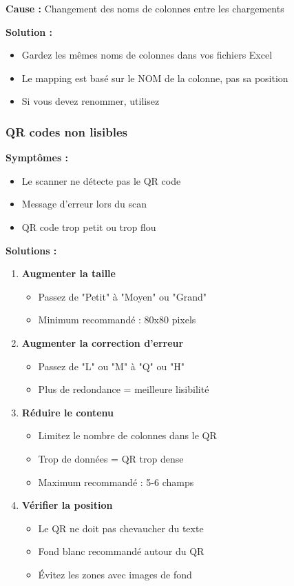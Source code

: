 \textbf{Cause :} Changement des noms de colonnes entre les chargements

\textbf{Solution :}
\begin{itemize}[leftmargin=*]
    \item Gardez les mêmes noms de colonnes dans vos fichiers Excel
    \item Le mapping est basé sur le NOM de la colonne, pas sa position
    \item Si vous devez renommer, utilisez 
\end{itemize}

\subsubsection{QR codes non lisibles}

\textbf{Symptômes :}
\begin{itemize}[leftmargin=*]
    \item Le scanner ne détecte pas le QR code
    \item Message d'erreur lors du scan
    \item QR code trop petit ou trop flou
\end{itemize}

\textbf{Solutions :}
\begin{enumerate}[leftmargin=*]
    \item \textbf{Augmenter la taille}
    \begin{itemize}
        \item Passez de "Petit" à "Moyen" ou "Grand"
        \item Minimum recommandé : 80x80 pixels
    \end{itemize}

    \item \textbf{Augmenter la correction d'erreur}
    \begin{itemize}
        \item Passez de "L" ou "M" à "Q" ou "H"
        \item Plus de redondance = meilleure lisibilité
    \end{itemize}

    \item \textbf{Réduire le contenu}
    \begin{itemize}
        \item Limitez le nombre de colonnes dans le QR
        \item Trop de données = QR trop dense
        \item Maximum recommandé : 5-6 champs
    \end{itemize}

    \item \textbf{Vérifier la position}
    \begin{itemize}
        \item Le QR ne doit pas chevaucher du texte
        \item Fond blanc recommandé autour du QR
        \item Évitez les zones avec images de fond
    \end{itemize}
\end{enumerate}

